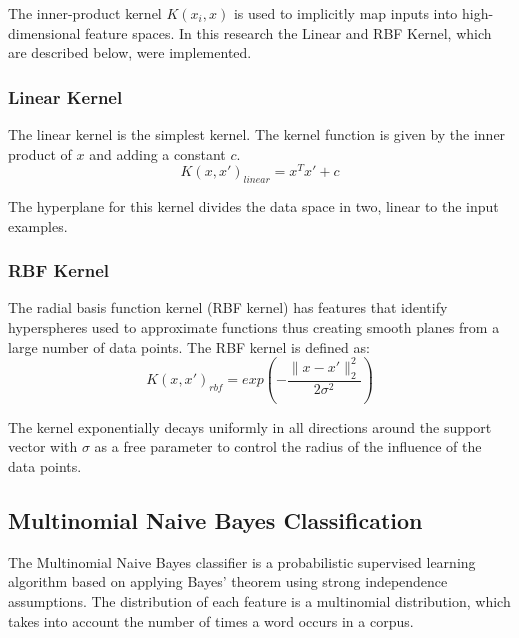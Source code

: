 The inner-product kernel $K(x_i,x)$  is used to implicitly map inputs into high-dimensional feature spaces. In this research the Linear and RBF Kernel, which are described below, were implemented.

\subsubsection{Linear Kernel}
The linear kernel is the simplest kernel. The kernel function is given by the inner product of $x $ and adding a constant $c$. 
\begin{equation}
K(x,x')_{linear} = x^T x' + c
\end{equation}

The hyperplane for this kernel divides the data space in two, linear to the input examples. 

\subsubsection{RBF Kernel}
The radial basis function kernel (RBF kernel) has features that identify hyperspheres used to approximate functions thus creating smooth planes from a large number of data points. The RBF kernel is defined as:
\begin{equation}
K(x,x')_{rbf} = exp\left(-\frac{\parallel x-x'\parallel^2_2}{2\sigma^2}\right)
\end{equation}

The kernel exponentially decays uniformly in all directions around the support vector with $\sigma$ as a free parameter to control the radius of the influence of the data points. 


\subsection{Multinomial Naive Bayes Classification}\label{sec:naivebayes}
The Multinomial Naive Bayes classifier is a probabilistic supervised learning algorithm based on applying Bayes' theorem using strong independence assumptions. The distribution of each feature is a multinomial distribution, which takes into account the number of times a word occurs in a corpus. 

